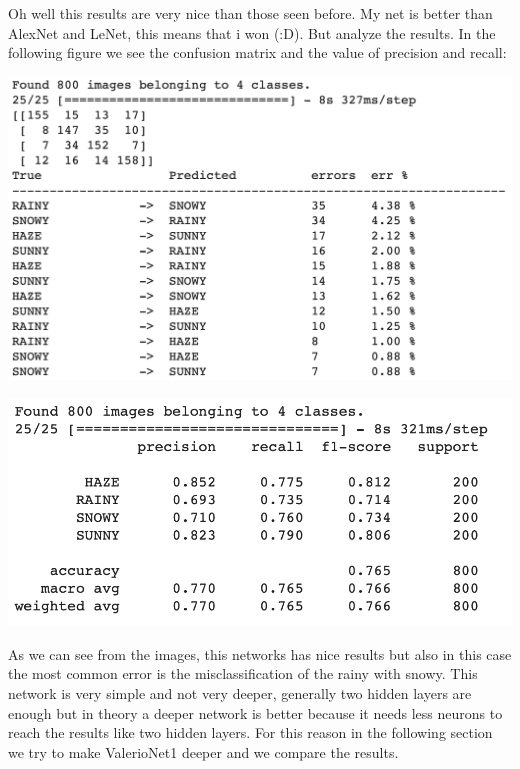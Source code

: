 \documentclass[12pt]{article}
\begin{document}
Oh well this results are very nice than those seen before. My net is better than AlexNet and LeNet, this means that i won (:D). But analyze the results. In the following figure we see the confusion matrix and the value of precision and recall:\newline \newline
\begin{minipage}[c]{.5\textwidth}
   \centering
   \includegraphics[width=\textwidth]{pic1}
\end{minipage}
\hspace{1em}
\begin{minipage}[c]{.5\textwidth}
   \centering
   \includegraphics[width=\textwidth]{pic2.png}
\end{minipage}

\bigskip
As we can see from the images, this networks has nice results but also in this case the most common error is the misclassification of the rainy with snowy. This network is very simple and not very deeper, generally two hidden layers are enough but in theory a deeper network is better because it needs less neurons to reach the results like two hidden layers. For this reason in the following section we try to make ValerioNet1 deeper and we compare the results.
\end{document}
